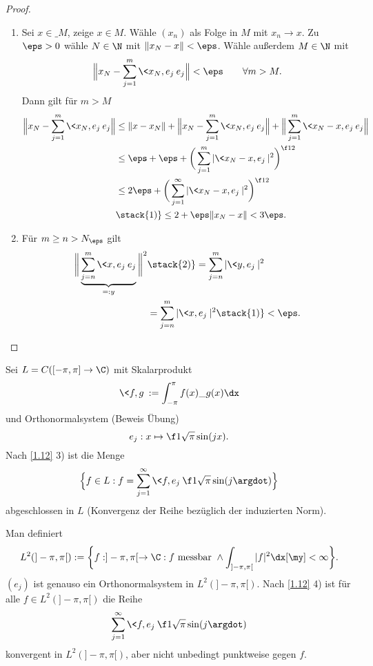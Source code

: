 \begin{st}
\begin{proof}
\begin{enumerate}[1)]
			\item
				Sei $x \in \_M$, zeige $x \in M$.
				Wähle $(x_n)$ als Folge in $M$ mit $x_n \to x$.
				Zu $\eps > 0$ wähle $N\in \N$ mit $\|x_N-x\| < \eps$.
				Wähle außerdem $M \in \N$ mit
				\[
					\Big\|x_N- \sum_{j=1}^m \<x_N,e_j\> e_j \Big\| < \eps
					\qquad \forall m > M.
				\]
				Dann gilt für $m > M$
				\begin{align*}
					\Big\|x_N- \sum_{j=1}^m \<x_N,e_j\> e_j \Big\| 
					&\le \|x-x_N\| + \Big\|x_N - \sum_{j=1}^m \<x_N,e_j\> e_j \Big\| + \Big\| \sum_{j=1}^m \<x_N-x,e_j\> e_j \Big\|	\\
					&\le \eps + \eps + \bigg(\sum_{j=1}^m |\<x_N-x,e_j\>|^2 \bigg)^{\f 12} \\
					&\le 2\eps + \bigg(\sum_{j=1}^\infty |\<x_N-x,e_j\>|^2 \bigg)^{\f 12} \\
					&\stack{1)}\le 2 + \eps\|x_N-x\|
					< 3 \eps.
				\end{align*}
			\item
				Für $m\ge n > N_\eps$ gilt
				\begin{align*}
					\bigg\|\underbrace{\sum_{j=n}^m \<x,e_j\>e_j}_{=:y}\bigg\|^2
					&\stack{2)}= \sum_{j=n}^m |\<y,e_j\>|^2 \\
					&= \sum_{j=n}^m |\<x,e_j\>|^2
					\stack{1)}< \eps.
				\end{align*}	
				\qedhere	
		\end{enumerate}
	\end{proof}
\end{st}

\begin{ex} \label{1.13}
	Sei $L = C([-\pi,\pi] \to \C)$ mit Skalarprodukt
	\[
		\<f,g\> := \int_{-\pi}^{\pi}f(x)\_{g(x)} \dx
	\]
	und Orthonormalsystem (Beweis Übung)
	\[
		e_j : x \mapsto \f 1{\sqrt{\pi}} \sin(jx).
	\]
	Nach \ref{1.12} 3) ist die Menge
	\[
		\Big\{ f \in L : f = \sum_{j=1}^\infty \<f,e_j\> \f 1{\sqrt{\pi}}\sin(j \argdot) \Big\}
	\]
	abgeschlossen in $L$ (Konvergenz der Reihe bezüglich der induzierten Norm).

	Man definiert
	\[
		L^2(]-\pi,\pi[) := \bigg\{ f: ]-\pi,\pi[ \to \C : f \text{ messbar } \land \int_{]-\pi,\pi[}|f|^2 \dx[\my] < \infty \bigg\}.
	\]
	$(e_j)$ ist genauso ein Orthonormalsystem in $L^2(]-\pi,\pi[)$.
	Nach \ref{1.12} 4) ist für alle $f \in L^2(]-\pi,\pi[)$ die Reihe
	\[
		\sum_{j=1}^\infty \<f,e_j\> \f 1{\sqrt{\pi}} \sin(j \argdot)
	\]
	konvergent in $L^2(]-\pi,\pi[)$, aber nicht unbedingt punktweise gegen $f$.
\end{ex}

